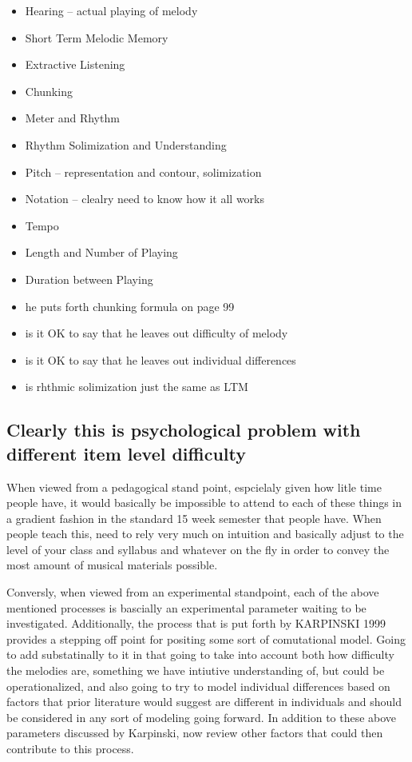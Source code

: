 \documentclass[]{book}
\theoremstyle{definition}
\theoremstyle{definition}
\theoremstyle{definition}
\theoremstyle{remark}
\begin{document}
\begin{itemize}
\item
  Hearing -- actual playing of melody
\item
  Short Term Melodic Memory
\item
  Extractive Listening
\item
  Chunking
\item
  Meter and Rhythm
\item
  Rhythm Solimization and Understanding
\item
  Pitch -- representation and contour, solimization
\item
  Notation -- clealry need to know how it all works
\item
  Tempo
\item
  Length and Number of Playing
\item
  Duration between Playing
\item
  he puts forth chunking formula on page 99
\item
  is it OK to say that he leaves out difficulty of melody
\item
  is it OK to say that he leaves out individual differences
\item
  is rhthmic solimization just the same as LTM
\end{itemize}

\hypertarget{clearly-this-is-psychological-problem-with-different-item-level-difficulty}{%
\subsection{Clearly this is psychological problem with different item
level
difficulty}\label{clearly-this-is-psychological-problem-with-different-item-level-difficulty}}

When viewed from a pedagogical stand point, espcielaly given how litle
time people have, it would basically be impossible to attend to each of
these things in a gradient fashion in the standard 15 week semester that
people have. When people teach this, need to rely very much on intuition
and basically adjust to the level of your class and syllabus and
whatever on the fly in order to convey the most amount of musical
materials possible.

Conversly, when viewed from an experimental standpoint, each of the
above mentioned processes is bascially an experimental parameter waiting
to be investigated. Additionally, the process that is put forth by
KARPINSKI 1999 provides a stepping off point for positing some sort of
comutational model. Going to add substatinally to it in that going to
take into account both how difficulty the melodies are, something we
have intiutive understanding of, but could be operationalized, and also
going to try to model individual differences based on factors that prior
literature would suggest are different in individuals and should be
considered in any sort of modeling going forward. In addition to these
above parameters discussed by Karpinski, now review other factors that
could then contribute to this process.
\end{document}
